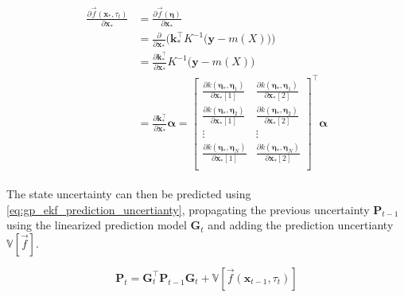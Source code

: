 \begin{align}\label{eq:gp_jacobian}
    \begin{split}
        \frac{\partial \vec{f}(\boldsymbol{x}_*, \tau_t)}{\partial \boldsymbol{x}_*} &= \frac{\partial \vec{f}(\boldsymbol{\eta})}{\partial \boldsymbol{x}_*} \\  &= \frac{\partial}{\partial \boldsymbol{x}_*} \bigg(\boldsymbol{k}_*^\intercal K^{-1} \big(\boldsymbol{y} - m(X)\big)\bigg)\\
        &= \frac{\partial \boldsymbol{k}_*^\intercal}{\partial \boldsymbol{x}_*} K^{-1} \big(\boldsymbol{y} - m(X)\big)\\
        &= \frac{\partial \boldsymbol{k}_*^\intercal}{\partial \boldsymbol{x}_*} \boldsymbol{\alpha} = \begin{bmatrix}
            \frac{\partial k(\boldsymbol{\eta}_*, \boldsymbol{\eta}_1)}{\partial \boldsymbol{x}_*[1]} & \frac{\partial k(\boldsymbol{\eta}_*, \boldsymbol{\eta}_1)}{\partial \boldsymbol{x}_*[2]} \\
            \frac{\partial k(\boldsymbol{\eta}_*, \boldsymbol{\eta}_2)}{\partial \boldsymbol{x}_*[1]} & \frac{\partial k(\boldsymbol{\eta}_*, \boldsymbol{\eta}_2)}{\partial \boldsymbol{x}_*[2]} \\
            \vdots                                                                                    & \vdots                                                                                    \\
            \frac{\partial k(\boldsymbol{\eta}_*, \boldsymbol{\eta}_N)}{\partial \boldsymbol{x}_*[1]} & \frac{\partial k(\boldsymbol{\eta}_*, \boldsymbol{\eta}_N)}{\partial \boldsymbol{x}_*[2]} \\
        \end{bmatrix}^\intercal \boldsymbol{\alpha}
    \end{split}
\end{align}

The state uncertainty can then be predicted using \cref{eq:gp_ekf_prediction_uncertianty}, propagating the previous uncertainty $\boldsymbol{P}_{t-1}$ using the linearized prediction model $\boldsymbol{G}_t$ and adding the prediction uncertianty $\mathbb{V}[\vec{f}]$.

\begin{equation}\label{eq:gp_ekf_prediction_uncertianty}
    \boldsymbol{P}_t = \boldsymbol{G}_t^\intercal \boldsymbol{P}_{t-1} \boldsymbol{G}_t + \mathbb{V}[\vec{f}(\boldsymbol{x}_{t-1}, \tau_t)]
\end{equation}


